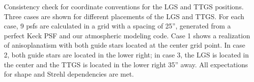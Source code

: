 Consistency check for coordinate conventions for the LGS and TTGS positions. Three cases are shown for different placements of the LGS and TTGS. For each case, 9 psfs are calculated in a grid with a spacing of 25”, generated from a perfect Keck PSF and our atmospheric modeling code. Case 1 shows a realization of anisoplanatism with both guide stars located at the center grid point. In case 2, both guide stars are located in the lower right;  in case 3, the LGS is located in the center and the TTGS is located in the lower right 35” away. All expectations for shape and Strehl dependencies are met.
\label{fig:lgs_geometry_check}
